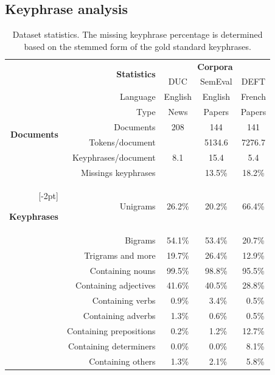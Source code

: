   \subsection{Keyphrase analysis}
  \label{subsec:keyphrase_analysis}
    \begin{table}[h]
      \centering
      \begin{tabular}{@{~}r@{~~}r@{~~}c@{~~}c@{~~}c@{~}}
        \toprule
        & \multirow{2}{*}[-2pt]{\textbf{Statistics}} & \multicolumn{3}{c}{\textbf{Corpora}}\\
        \cmidrule{3-5}
        & & DUC & SemEval & DEFT\\
        \midrule
        \multirow{6}{*}[-2pt]{\begin{sideways}\textbf{Documents}\end{sideways}} & Language & English & English & French\\
        & Type & News & Papers & Papers\\
        & Documents & 208 & 144 & 141\\
        & Tokens/document & & 5134.6 & 7276.7\\
        & Keyphrases/document & 8.1 & 15.4 & 5.4\\
        & Missings keyphrases & & 13.5\% & 18.2\%\\
        \addlinespace[\defaultaddspace]
        \multirow{10}{*}[-2pt]{\begin{sideways}\textbf{Keyphrases}\end{sideways}} & Unigrams & 26.2\% & 20.2\% & 66.4\%\\
        & Bigrams & 54.1\% & 53.4\% & 20.7\%\\
        & Trigrams and more & 19.7\% & 26.4\% & 12.9\%\\
        & Containing nouns & 99.5\% & 98.8\% & 95.5\%\\
        & Containing adjectives & 41.6\% & 40.5\% & 28.8\%\\
        & Containing verbs & $~~$0.9\% & $~~$3.4\% & $~~$0.5\%\\
        & Containing adverbs & $~~$1.3\% & $~~$0.6\% & $~~$0.5\%\\
        & Containing prepositions & $~~$0.2\% & $~~$1.2\% & 12.7\%\\
        & Containing determiners & $~~$0.0\% & $~~$0.0\% & $~~$8.1\%\\
        & Containing others & $~~$1.3\% & $~~$2.1\% & $~~$5.8\%\\
        \bottomrule
      \end{tabular}
      \caption{Dataset statistics. The missing keyphrase percentage is
               determined based on the stemmed form of the gold standard
               keyphrases. \label{tab:dataset_statistics}}
    \end{table}

